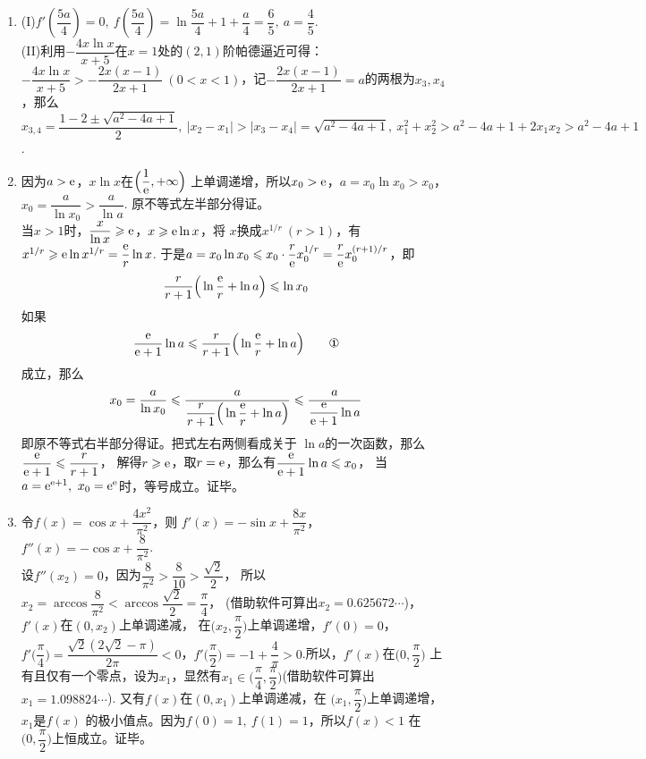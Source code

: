 \begin{enumerate}[label={\textbf{\thechapter.\arabic*}},leftmargin=
    \inteval{\myenumleftmargin}pt]
\item 
(I)$ f'(\dfrac{5a}{4})=0,\ f(\dfrac{5a}{4})=\ln \dfrac{5a}{4}+1+\dfrac{a}{4}=\dfrac{6}{5},\ a=\dfrac{4}{5} $.\\
(II)利用$ -\dfrac{4x\ln x}{x+5} $在$ x=1 $处的$ (2,1) $阶帕德逼近可得：$ -\dfrac{4x\ln x}{x+5}>-\dfrac{2x(x-1)}{2x+1}\ (0<x<1) $，记$ -\dfrac{2x(x-1)}{2x+1}=a $的两根为$ x_3,x_4 $，那么$ x_{3,4}=\dfrac{1-2\pm \sqrt{a^2-4a+1}}{2},\  |x_2-x_1|>|x_3-x_4|=\sqrt{a^2-4a+1},\ x_1^2+x_2^2>a^2-4a+1+2x_1x_2>a^2-4a+1 $.

\item 
因为$ a>\mathrm{e} $，$ x\ln x $在$ \Big(\dfrac{1}{\mathrm{e}},+\infty\Big) $
上单调递增，所以$ x_0>\mathrm{e} $，$ a=x_0\ln x_0>x_0 $，$ x_0=\dfrac{a}{\ln x_0}
>\dfrac{a}{\ln a} $. 原不等式左半部分得证。\\
当$ x>1 $时，$ \dfrac{x}{\ln x}\geqslant \mathrm{e} $，$ x\geqslant \mathrm{e}\ln x $，将
$ x $换成$ x^{1/r}\ (r>1) $，有$ x^{1/r}\geqslant \mathrm{e}\ln x^{1/r}=\dfrac{\mathrm{e}}{r}\ln x $.
于是$ a=x_0\ln x_0\leqslant x_0\cdot \dfrac{r}{\mathrm{e}}x_0^{1/r}=\dfrac{r}{\mathrm{e}}
x_0^{(r+1)/r} $，即
\begin{gather*}
    \dfrac{r}{r+1}\Big(\ln\dfrac{\mathrm{e}}{r}+\ln a\Big)\leqslant \ln x_0
\end{gather*}
如果
\begin{gather}
    \dfrac{\e}{\e+1}\ln a\leq \dfrac{r}{r+1}
    \Big(\ln\dfrac{\e}{r}+\ln a\Big)  \tag*{\ding{172}}
\end{gather}
成立，那么
\begin{gather*}
    x_0=\dfrac{a}{\ln x_0}\leqslant \dfrac{a}{\dfrac{r}{r+1}\Big(
        \ln\dfrac{\mathrm{e}}{r}+\ln a\Big)} 
    \leqslant \dfrac{a}{\dfrac{\mathrm{e}}{\mathrm{e}+1}\ln a}
\end{gather*}
即原不等式右半部分得证。把式左右两侧看成关于
$ \ln a $的一次函数，那么$ \dfrac{\mathrm{e}}{\mathrm{e}+1}\leqslant \dfrac{r}{r+1} $，
解得$ r\geqslant \mathrm{e} $，取$ r=\mathrm{e} $，那么有$ \dfrac{\mathrm{e}}{\mathrm{e}+1}\ln a\leqslant x_0 $，
当$ a=\e^{\e+1},\ x_0=\e^{\e} $时，等号成立。证毕。

\item 
令$ f(x)=\cos x+\dfrac{4x^2}{\pi^2} $，则
$ f'(x) =-\sin x+\dfrac{8x}{\pi^2} $，
$ f''(x)=-\cos x+\dfrac{8}{\pi^2} $.\\
设$ f''(x_2)=0 $，因为$ \dfrac{8}{\pi^2}>\dfrac{8}{10}>\dfrac{\sqrt{2}}{2} $，
所以$ x_2=\arccos\dfrac{8}{\pi^2}<\arccos\dfrac{\sqrt{2}}{2}=\dfrac{\pi}{4} $，
(借助软件可算出$ x_2=0.625672\cdots $)，$ f'(x) $在$ (0,x_2) $上单调递减，
在$ \Big(x_2,\dfrac{\pi}{2}\Big) $上单调递增，$ f'(0)=0 $，
$ f'\Big(\dfrac{\pi}{4}\Big)
=\dfrac{\sqrt{2}(2\sqrt{2}-\pi)}{2\pi}<0 $，$ f'\Big(\dfrac{\pi}{2}\Big)
=-1+\dfrac{4}{\pi}>0 $.所以，$ f'(x) $在$ \big(0,\dfrac{\pi}{2}\big) $
上有且仅有一个零点，设为$ x_1 $，显然有$ x_1\in\Big(\dfrac{\pi}{4},
\dfrac{\pi}{2}\Big) $(借助软件可算出$ x_1=1.098824\cdots $).
又有$ f(x) $在$ (0,x_1) $上单调递减，在
$ \Big(x_1,\dfrac{\pi}{2}\Big) $上单调递增，$ x_1 $是$ f(x) $
的极小值点。因为$ f(0)=1,\ f(1)=1 $，所以$ f(x)<1 $
在$ \Big(0,\dfrac{\pi}{2}\Big) $上恒成立。证毕。


\end{enumerate}
